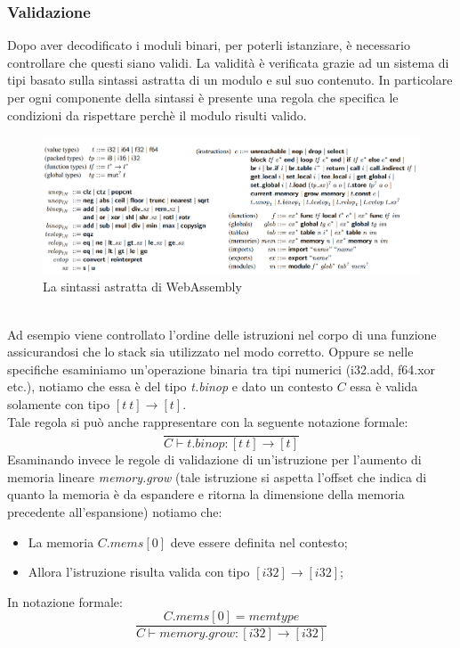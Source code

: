 \subsubsection{Validazione}
Dopo aver decodificato i moduli binari, per poterli istanziare, è necessario controllare che questi siano validi.
La validità è verificata grazie ad un sistema di tipi basato sulla sintassi astratta di un modulo e sul suo contenuto. In particolare per ogni componente della sintassi è presente una regola che specifica le condizioni da rispettare perchè il modulo risulti valido.
\begin{figure}
        \begin{center}
                \includegraphics[width=1\columnwidth]{images/wasmSyntax.png}
        \end{center}
        \caption{La sintassi astratta di WebAssembly}
        \label{fig:wasmSyntax}
\end{figure}
\\Ad esempio viene controllato l'ordine delle istruzioni nel corpo di una funzione assicurandosi che lo stack sia utilizzato nel modo corretto.
Oppure se nelle specifiche esaminiamo un'operazione binaria tra tipi numerici (i32.add, f64.xor etc.), notiamo che essa è del tipo \emph{t.binop} e dato un contesto \(C\) essa è valida solamente con tipo \([t~t]{\rightarrow} [t]\).
\\Tale regola si può anche rappresentare con la seguente notazione formale:
\begin{equation*}
\frac{
}{
        C {\vdash} t\mathsf{.}{\mathit{binop}} : [t~t] {\rightarrow} [t]
}
\end{equation*}
Esaminando invece le regole di validazione di un'istruzione per l'aumento di memoria lineare \emph{memory.grow} (tale istruzione si aspetta l'offset che indica di quanto la memoria è da espandere e ritorna la dimensione della memoria precedente all'espansione) notiamo che:
\begin{itemize}
        \item La memoria \(C.{\mathit{mems}}[0]\) deve essere definita nel contesto;
        \item Allora l'istruzione risulta valida con tipo \([{\mathit{i32}}] {\rightarrow} [{\mathit{i32}}]\);
\end{itemize}
In notazione formale:
\begin{equation*}
        \frac{
        C.{\mathit{mems}}[0] = {\mathit{memtype}}
      }{
        C {\vdash} {\mathit{memory.grow}} : [{\mathit{i32}}] {\rightarrow} [{\mathit{i32}}]
      }        
\end{equation*}
